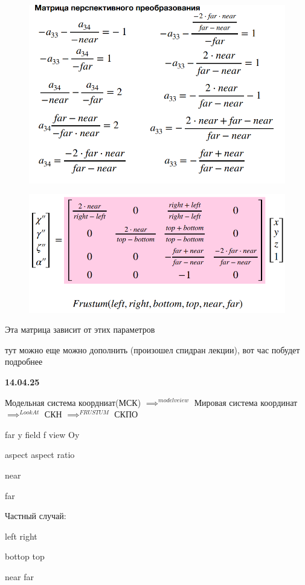 \documentclass{article}
\begin{document}
\begin{figure} [H]
    \includegraphics[width=0.70\linewidth]{Снимок экрана 2025-04-07 123451.png}
\end{figure}

\begin{figure} [H]
    \includegraphics[width=0.70\linewidth]{Снимок экрана 2025-04-07 123520.png}
\end{figure}

Эта матрица зависит от этих параметров

тут можно еще можно дополнить (произошел спидран лекции), вот час побудет подробнее




\vspace{1cm}


\textbf{14.04.25}


Модельная система коордниат(МСК) $\implies^{model veiew}$ Мировая система координат $\implies^{LookAt}$ СКН 
$\implies ^{FRUSTUM}$ СКПО

far y field f view Oy

aspect aspect ratio

near

far


Частный случай:

left right

bottop top

near far
\end{document}
